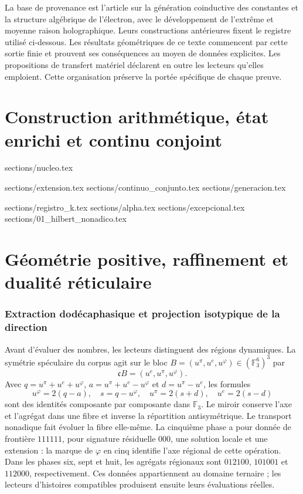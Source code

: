 \documentclass[a4paper,10pt]{article}
\theoremstyle{definition}\newtheorem{definition}[theorem]{Définition}
\theoremstyle{remark}\newtheorem{remark}[theorem]{Remarque}
\newcommand{\TRIT}{\mathrm{TRIT}}\newcommand{\id}{\operatorname{id}}
\numberwithin{equation}{section}
\begin{document}
La base de provenance est l'article sur la génération coinductive des constantes et la structure algébrique de l'électron, avec le développement de l'extrême et moyenne raison holographique. Leurs constructions antérieures fixent le registre utilisé ci-dessous. Les résultats géométriques de ce texte commencent par cette sortie finie et prouvent ses conséquences au moyen de données explicites. Les propositions de transfert matériel déclarent en outre les lecteurs qu'elles emploient. Cette organisation préserve la portée spécifique de chaque preuve.

\clearpage
\part{Construction arithmétique, état enrichi et continu conjoint}
\begingroup
\sloppy
\renewcommand{\TRIT}{\{-1,0,+1\}}
{sections/nucleo.tex}
\clearpage

{sections/extension.tex}
{sections/continuo_conjunto.tex}
{sections/generacion.tex}
\clearpage


\clearpage

\clearpage
{sections/registro_k.tex}
{sections/alpha.tex}
{sections/excepcional.tex}
{sections/01_hilbert_nonadico.tex}
\endgroup
\clearpage
\part{Géométrie positive, raffinement et dualité réticulaire}



\section{Extraction dodécaphasique et projection isotypique de la direction}
\label{sec:register}
Avant d’évaluer des nombres, les lecteurs distinguent des régions dynamiques.
La symétrie spéculaire du corpus agit sur le bloc
\(B=(u^\pi,u^e,u^\varphi)\in(\mathbb F_3^6)^3\) par
\[
 \mathfrak cB=(u^e,u^\pi,u^\varphi).
\]
Avec \(q=u^\pi+u^e+u^\varphi\), \(a=u^\pi+u^e-u^\varphi\) et \(d=u^\pi-u^e\), les formules
\[
 u^\varphi=2(q-a),\quad s=q-u^\varphi,\quad
 u^\pi=2(s+d),\quad u^e=2(s-d)
\]
sont des identités composante par composante dans \(\mathbb F_3\). Le miroir conserve l'axe et l'agrégat dans une fibre et inverse la répartition antisymétrique. Le transport nonadique fait évoluer la fibre elle-même. La cinquième phase a pour donnée de frontière \(111111\), pour signature résiduelle \(000\), une solution locale et une extension : la marque de \(\varphi\) en cinq identifie l'axe régional de cette opération. Dans les phases six, sept et huit, les agrégats régionaux sont \(012100\), \(101001\) et \(112000\), respectivement. Ces données appartiennent au domaine ternaire ; les lecteurs d'histoires compatibles produisent ensuite leurs évaluations réelles.
\end{document}
